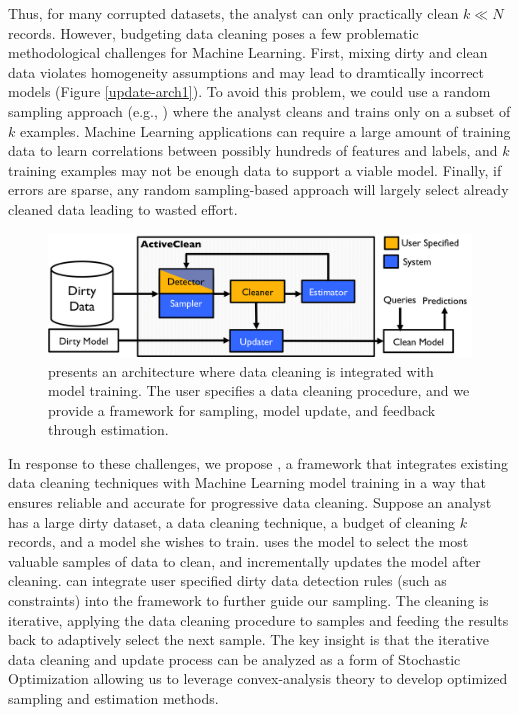 Thus, for many corrupted datasets, the analyst can only practically clean $k \ll N$ records.
However, budgeting data cleaning poses a few problematic methodological challenges for Machine Learning.
First, mixing dirty and clean data violates homogeneity assumptions and may lead to dramtically incorrect models (Figure \ref{update-arch1}).
To avoid this problem, we could use a random sampling approach (e.g., \cite{wang1999sample}) where the analyst cleans and trains only on a subset of $k$ examples.
Machine Learning applications can require a large amount of training data to learn correlations between possibly hundreds of features and labels, and $k$ training examples may not be enough data to support a viable model.
Finally, if errors are sparse, any random sampling-based approach will largely select already cleaned data leading to wasted effort.

\begin{figure}[t]
\centering
 \includegraphics[width=\columnwidth]{figs/arch.png}
 \caption{\sysfull presents an architecture where data cleaning is integrated with model training. The user specifies a data cleaning procedure, and we provide a framework for sampling, model update, and feedback through estimation. \label{sys-arch}}\vspace{-2em}
\end{figure}

In response to these challenges, we propose \sys, a framework that integrates existing data cleaning techniques with Machine Learning model training in a way that ensures reliable and accurate for progressive data cleaning.
Suppose an analyst has a large dirty dataset, a data cleaning technique, a budget of cleaning $k$ records, and a model she wishes to train.
\sys uses the model to select the most valuable samples of data to clean, and incrementally updates the model after cleaning.
\sys can integrate user specified dirty data detection rules (such as constraints) into the framework to further guide our sampling.
The cleaning is iterative, applying the data cleaning procedure to samples and feeding the results back to adaptively select the next sample. 
The key insight is that the iterative data cleaning and update process can be analyzed as a form of Stochastic Optimization \cite{bertsekas2011incremental} allowing us to leverage convex-analysis theory to develop optimized sampling and estimation methods.


